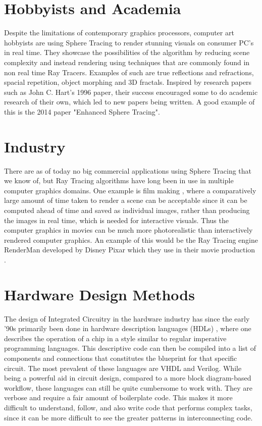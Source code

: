 	\section{ Hobbyists and Academia }

		Despite the limitations of contemporary graphics processors, computer
		art hobbyists are using Sphere Tracing to render stunning visuals on consumer PC's in real time. They showcase the possibilities of the
		algorithm by reducing scene complexity and instead rendering using
		techniques that are commonly found in non real time Ray Tracers.
		Examples of such are true reflections and refractions, spacial
		repetition, object morphing and 3D fractals\cite{InigoQuilez}. 
		Inspired by research papers such as John C. Hart's 1996
		paper\cite{Hart1996}, their success encouraged some to do academic
		research of their own, which led to new papers being written. A good
		example of this is the 2014 paper "Enhanced Sphere
		Tracing"\cite{Korndorfer2014}.

	\section{ Industry }		

		There are as of today no big commercial applications using Sphere
		Tracing that we know of, but Ray Tracing algorithms have long been in
		use in multiple computer graphics domains. One example is film
		making \cite{Christensen2006}, where a comparatively large amount of
		time taken to render a scene can be acceptable since it can be computed
		ahead of time and saved as individual images, rather than producing
		the images in real time, which is needed for interactive visuals.
		Thus the computer graphics in movies can be much more photorealistic
		than interactively rendered computer graphics. An example of this
		would be the Ray Tracing engine RenderMan developed by Disney Pixar
		which they use in their movie production \cite{Christensen2006}.

	\section{ Hardware Design Methods } 
	
		The design of Integrated Circuitry in the hardware industry has since
		the early '90s primarily been done in hardware description languages
		(HDLs) \cite{Chen2012}, where one describes the operation of a chip in a
		style similar to regular imperative programming languages. This
		descriptive code can then be compiled into a list of components and
		connections that constitutes the blueprint for that specific circuit.
		The most prevalent of these languages are VHDL and 
		Verilog\cite{Chen2012}. While being a powerful aid in circuit design,
		compared to a more block diagram-based workflow\cite{Lauwereins},
		these languages can still be quite cumbersome to work with. They are
		verbose and require a fair amount of boilerplate code. This makes it
		more difficult to understand, follow, and also write code that
		performs complex tasks, since it can be more difficult to see the
		greater patterns in interconnecting code.
		

